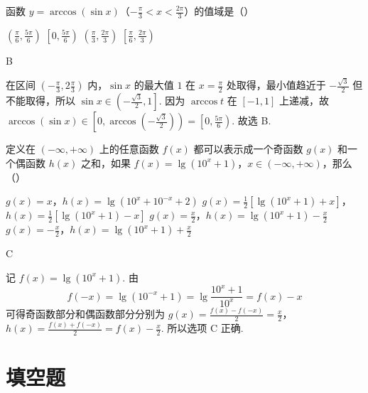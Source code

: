 \begin{problem}
函数 \(y = \arccos (\sin x)\)（\(-\frac{\pi}{3} < x < \frac{2\pi}{3}\)）的值域是（\quad）

\choices
    {\(\left(\frac{\pi}{6}, \frac{5\pi}{6}\right)\)}
    {\(\left[0, \frac{5\pi}{6}\right)\)}
    {\(\left(\frac{\pi}{3}, \frac{2\pi}{3}\right)\)}
    {\(\left[\frac{\pi}{6}, \frac{2\pi}{3}\right)\)}
\end{problem}

\begin{answer}
B
\end{answer}

\begin{solution}
在区间 \(\left(-\frac{\pi}{3},2\frac{\pi}{3}\right)\) 内，\(\sin x\) 的最大值 \(1\) 在 \(x=\frac{\pi}{2}\) 处取得，最小值趋近于 \(-\frac{\sqrt{3}}{2}\) 但不能取得，所以 \(\sin x\in\left(-\frac{\sqrt{3}}{2},1\right]\).
因为 \(\arccos t\) 在 \([-1,1]\) 上递减，故
\(\arccos(\sin x)\in\left[0,\arccos\left(-\frac{\sqrt{3}}{2}\right)\right)=\left[0,\frac{5\pi}{6}\right)\).
故选 B.
\end{solution}

\begin{problem}
定义在 \((- \infty, + \infty)\) 上的任意函数 \(f(x)\) 都可以表示成一个奇函数 \(g(x)\) 和一个偶函数 \(h(x)\) 之和，如果 \(f(x) = \lg \left(10^x + 1\right)\)，\(x \in (-\infty, +\infty)\)，那么（\quad）

\choices
    {\(g(x) = x\)，\(h(x) = \lg \left(10^x + 10^{-x} + 2\right)\)}
    {\(g(x) = \frac{1}{2}\left[\lg \left(10^x + 1\right) + x\right]\)，\(h(x) = \frac{1}{2}\left[\lg \left(10^x + 1\right) - x\right]\)}
    {\(g(x) = \frac{x}{2}\)，\(h(x) = \lg \left(10^x + 1\right) - \frac{x}{2}\)}
    {\(g(x) = -\frac{x}{2}\)，\(h(x) = \lg \left(10^x + 1\right) + \frac{x}{2}\)}
\end{problem}

\begin{answer}
C
\end{answer}

\begin{solution}
记 \(f(x)=\lg(10^x+1)\). 由
\[
f(-x)=\lg(10^{-x}+1)=\lg\frac{10^x+1}{10^x}=f(x)-x
\]
可得奇函数部分和偶函数部分分别为 \(g(x)=\frac{f(x)-f(-x)}{2}=\frac{x}{2}\)，\(h(x)=\frac{f(x)+f(-x)}{2}=f(x)-\frac{x}{2}\).
所以选项 C 正确.
\end{solution}

\section{填空题}

